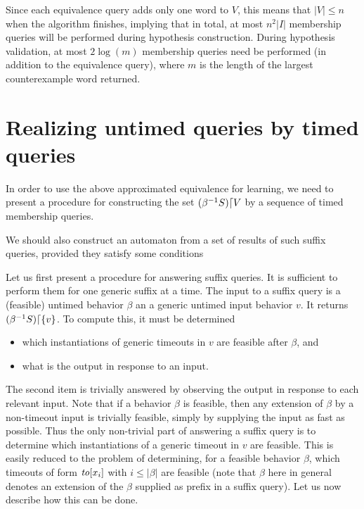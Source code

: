 Since each equivalence query adds only one
word to $V$, this means that $|V| \leq n$ when the algorithm finishes,
implying that in total, at most $n^2|I|$ membership queries
will be performed during hypothesis construction.
During hypothesis
validation, at most $2\log(m)$ membership queries need be performed
(in addition to the equivalence query), where
$m$ is the length of the largest counterexample word returned.


\section{Realizing untimed queries by timed queries}

In order to use the above approximated equivalence for learning, we need to
present a procedure for constructing the set
$({\beta}^{-1}{S})\lceil{V}$ by a sequence of timed membership queries.

We should also construct an automaton from a set of results of such
suffix queries, provided they satisfy some conditions

Let us first present a procedure for answering suffix queries. It is
sufficient to perform them for one generic suffix at a time.
The input to a suffix query is a (feasible) untimed behavior $\beta$ an a
generic untimed input behavior $v$. It returns
$({\beta}^{-1}{S})\lceil{\lbrace v\rbrace}$. To compute this, it must be determined
\begin{itemize}
\item which instantiations of generic timeouts in $v$ are feasible after $\beta$, and
\item what is the output in response to an input.
\end{itemize}
The second item is trivially answered by observing the output in response to
each relevant input. Note that if a behavior $\beta$ is feasible, then
any extension of $\beta$ by a non-timeout input is trivially feasible, simply
by supplying the input as fast as possible. Thus the only non-trivial part
of answering a suffix query is to determine which instantiations of a generic
timeout in $v$ are feasible. This is easily reduced to the problem of
determining, for a feasible behavior $\beta$, which timeouts of form
$\mathit{to}[x_i]$ with $i \leq |\beta|$ are feasible (note that $\beta$ here in
general denotes an extension of the $\beta$ supplied as prefix in a
suffix query). Let us now describe how this can be done.

